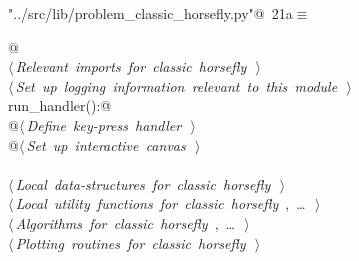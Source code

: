 \documentclass[11.5pt]{report}
\begin{document}
\begin{flushleft} \small\label{scrap13}\raggedright\small
{} \verb@"../src/lib/problem_classic_horsefly.py"@\nobreak\ {\footnotesize {21a}}$\equiv$
\vspace{-1ex}
\begin{list}{}{} \item
\mbox{}\verb@    @\\
\mbox{}\verb@@\hbox{$\langle\,${\itshape Relevant imports for classic horsefly}\nobreak\ {\footnotesize {}}$\,\rangle$}\verb@@\\
\mbox{}\verb@@\hbox{$\langle\,${\itshape Set up logging information relevant to this module}\nobreak\ {\footnotesize {}}$\,\rangle$}\verb@@\\
\mbox{}\verb@def run_handler():@\\
\mbox{}\verb@    @\hbox{$\langle\,${\itshape Define key-press handler}\nobreak\ {\footnotesize {}}$\,\rangle$}\verb@@\\
\mbox{}\verb@    @\hbox{$\langle\,${\itshape Set up interactive canvas}\nobreak\ {\footnotesize {}}$\,\rangle$}\verb@@\\
\mbox{}\verb@@\\
\mbox{}\verb@@\hbox{$\langle\,${\itshape Local data-structures for classic horsefly}\nobreak\ {\footnotesize {}}$\,\rangle$}\verb@@\\
\mbox{}\verb@@\hbox{$\langle\,${\itshape Local utility functions for classic horsefly}\nobreak\ {\footnotesize {}, \ldots\ }$\,\rangle$}\verb@@\\
\mbox{}\verb@@\hbox{$\langle\,${\itshape Algorithms for classic horsefly}\nobreak\ {\footnotesize {}, \ldots\ }$\,\rangle$}\verb@@\\
\mbox{}\verb@@\hbox{$\langle\,${\itshape Plotting routines for classic horsefly}\nobreak\ {\footnotesize {}}$\,\rangle$}\verb@@\\
\mbox{}\verb@@{\NWsep}
\end{list}
\vspace{-1.5ex}
\footnotesize
\begin{list}{}{\setlength{\itemsep}{-\parsep}\setlength{\itemindent}{-\leftmargin}}

\item{}
\end{list}
\vspace{4ex}
\end{flushleft}
\end{document}
